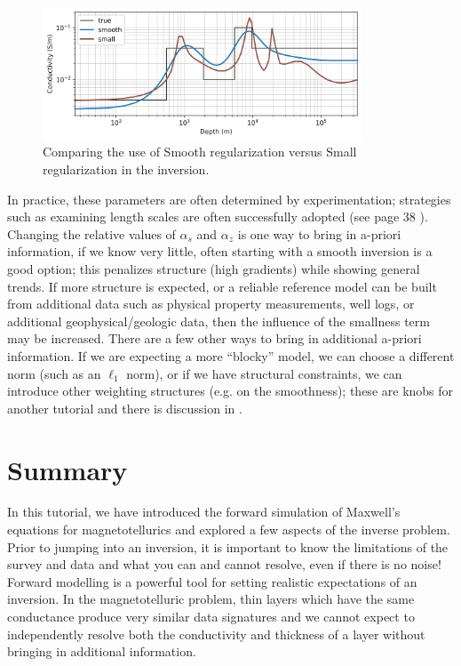 \documentclass[11pt,oneside]{article}
\begin{document}
\begin{figure}[htb!]
    \centering
    \includegraphics[width=0.85\textwidth]{images/alphas.png}
\caption{Comparing the use of Smooth regularization versus Small regularization in the inversion.}
\label{fig:alphas}
\end{figure}


In practice, these parameters are often determined by experimentation; strategies such as examining length scales are often successfully adopted (see page 38 \cite{OldenburgTutorial}). Changing the relative values of $\alpha_s$ and $\alpha_z$ is one way to bring in a-priori information, if we know very little, often starting with a smooth inversion is a good option; this penalizes structure (high gradients) while showing general trends. If more structure is expected, or a reliable reference model can be built from additional data such as physical property measurements, well logs, or additional geophysical/geologic data, then the influence of the smallness term may be increased. There are a few other ways to bring in additional a-priori information. If we are expecting a more ``blocky'' model, we can choose a different norm (such as an $\ell_1$ norm), or if we have structural constraints, we can introduce other weighting structures (e.g. on the smoothness); these are knobs for another tutorial and there is discussion in \cite{OldenburgTutorial}.

\section{Summary}
In this tutorial, we have introduced the forward simulation of Maxwell’s equations for magnetotellurics and explored a few aspects of the inverse problem. Prior to jumping into an inversion, it is important to know the limitations of the survey and data and what you can and cannot resolve, even if there is no noise! Forward modelling is a powerful tool for setting realistic expectations of an inversion. In the magnetotelluric problem, thin layers which have the same conductance produce very similar data signatures and we cannot expect to independently resolve both the conductivity and thickness of a layer without bringing in additional information.
\end{document}

